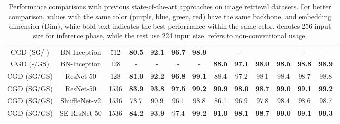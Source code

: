 \documentclass[10pt,twocolumn,letterpaper]{article}
\begin{document}
\begin{CJK}{UTF8}{mj}
\begin{table*}[h!t]
\begin{center}
{\begin{adjustbox}{width=0.85\textwidth,center}
\begin{tabular}{c|c|c|cccc|cccccc}
    CGD (SG/\space\space-\space\space)& \color{OliveGreen}BN-Inception     & \color{OliveGreen}512                  & {\color{OliveGreen}\textbf{80.5}} & {\color{OliveGreen}\textbf{92.1}} & {\color{OliveGreen}\textbf{96.7}} & {\color{OliveGreen}\textbf{98.9}} & -    & -    & -    & -    & -    & -    \\
    CGD (\space\space-\space\space/GS)& \color{OliveGreen}BN-Inception     & \color{OliveGreen}128                  & -    & -    & -    & -    & {\color{OliveGreen}\textbf{88.5}} & {\color{OliveGreen}\textbf{97.1}} & {\color{OliveGreen}\textbf{98.0}} & {\color{OliveGreen}\textbf{98.5}} & {\color{OliveGreen}\textbf{98.8}} & {\color{OliveGreen}\textbf{98.9}}   \\
    CGD (SG/GS)             & \color{blue}ResNet-50                  & \color{blue}128                  & {\color{blue}\textbf{81.0}} & {\color{blue}\textbf{92.2}} & {\color{blue}\textbf{96.8}} & {\color{blue}\textbf{99.1}} & 88.4 & 97.2 & 98.1 & 98.4 & 98.7 & 98.8 \\
    CGD (SG/GS)             & \color{red}ResNet-50         & \color{red}1536                 & {\color{red}\textbf{83.9}} & {\color{red}\textbf{93.8}} & {\color{red}\textbf{97.5}} & {\color{red}\textbf{99.2}} & {\color{red}\textbf{90.9}} & {\color{red}\textbf{98.0}} & {\color{red}\textbf{98.7}} & {\color{red}\textbf{99.0}} & {\color{red}\textbf{99.1}} & {\color{red}\textbf{99.2}} \\
    CGD (SG/GS)             & ShuffleNet-v2             & 1536                 & 78.7   & 90.9   & 96.1   & 98.8  & 86.1 & 96.9 & 97.8 &  98.4 & 98.6 & 98.7   \\
    CGD (SG/GS)             & SE-ResNet-50      & 1536                 & \textbf{84.2} & \textbf{93.9} & 97.4 & \textbf{99.2} & \textbf{91.9} & \textbf{98.1} & \textbf{98.7} & \textbf{99.0} & \textbf{99.1} & \textbf{99.3} \\ \hline
    \end{tabular}
    \end{adjustbox}
    \label{table:sota2}
}

\vspace{1em}
\caption{Performance comparisons with previous state-of-the-art approaches on image retrieval datasets.
For better comparison, values with the same color ({\color{Plum}purple}, {\color{blue}blue}, {\color{OliveGreen}green}, {\color{red} red}) have the same backbone, and embedding dimension (Dim), while bold text indicates the best performance within the same color.
 denotes 256 input size for inference phase, while the rest use 224 input size.
 refers to non-conventional usage.}
\label{table:sota}
\end{center}
\vspace{-1em}
\end{table*}


\end{CJK}
\end{document}
